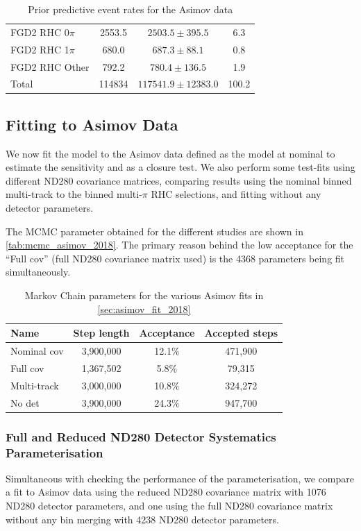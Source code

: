 \begin{table}
\begin{tabular} {l | c c | c}
		\hline
		FGD2 \numu RHC 0$\pi$   & 2553.5   & $2503.5\pm395.5$   & 6.3  \\
		FGD2 \numu RHC 1$\pi$   & 680.0    & $687.3\pm88.1$     & 0.8  \\
		FGD2 \numu RHC Other    & 792.2   	& $780.4\pm136.5$     & 1.9  \\
		\hline
		Total                   & 114834    & $117541.9\pm12383.0$  & 100.2 \\
		\hline
		\hline
	\end{tabular}
	\caption{Prior predictive event rates for the Asimov data}
	\label{tab:asimov_prior_pred_2018}
\end{table}

\subsection{Fitting to Asimov Data}
\label{sec:asimov_fit_2018}
We now fit the model to the Asimov data defined as the model at nominal to estimate the sensitivity and as a closure test. We also perform some test-fits using different ND280 covariance matrices, comparing results using the nominal binned multi-track to the binned multi-$\pi$ RHC selections, and fitting without any detector parameters.

The MCMC parameter obtained for the different studies are shown in \autoref{tab:mcmc_asimov_2018}. The primary reason behind the low acceptance for the ``Full cov'' (full ND280 covariance matrix used) is the 4368 parameters being fit simultaneously.
\begin{table}[h]
	\begin{tabular}{l | c c c}
		\hline
		\hline
		Name		&	Step length & Acceptance & Accepted steps \\
		\hline
		Nominal cov	& 	3,900,000	& 12.1\%	 & 471,900 \\
		Full cov	& 	1,367,502	& 5.8\%		 & 79,315 \\
		Multi-track & 	3,000,000	& 10.8\%	 & 324,272 \\
		No det		& 	3,900,000	& 24.3\%	 & 947,700 \\
		\hline
		\hline
	\end{tabular}
	\caption{Markov Chain parameters for the various Asimov fits in \autoref{sec:asimov_fit_2018}}
	\label{tab:mcmc_asimov_2018}
\end{table}

\subsubsection{Full and Reduced ND280 Detector Systematics Parameterisation}
Simultaneous with checking the performance of the parameterisation, we compare a fit to Asimov data using the reduced ND280 covariance matrix with 1076 ND280 detector parameters, and one using the full ND280 covariance matrix without any bin merging with 4238 ND280 detector parameters.

